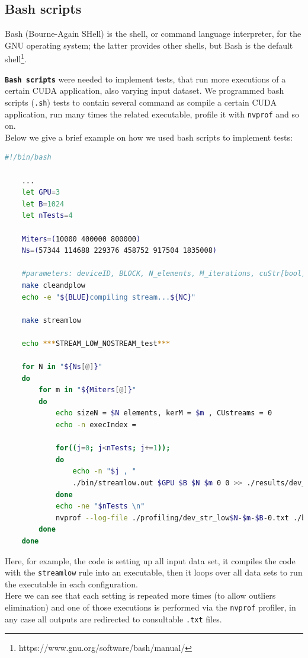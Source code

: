 	\subsection{Bash scripts}
	\label{subs:bash}
	Bash (Bourne-Again SHell) is the shell, or command language interpreter, for the GNU operating system; the latter provides other shells, but Bash is the default  shell\footnote{https://www.gnu.org/software/bash/manual/}. 
	
	\textbf{\texttt{Bash scripts}} were needed to implement tests, that run more executions of a certain CUDA application, also varying input dataset.
	We programmed bash scripts (\texttt{.sh}) tests to contain several command as compile a certain CUDA application, run many times the related executable, profile it with \texttt{nvprof} and so on.\\
	Below we give a brief example on how we used bash scripts to implement tests:
	\begin{lstlisting}[caption={Tests on bash scripts example},language=bash]
	#!/bin/bash
	
	...			
	let GPU=3
	let B=1024
	let nTests=4

	Miters=(10000 400000 800000)
	Ns=(57344 114688 229376 458752 917504 1835008)
		
	#parameters: deviceID, BLOCK, N_elements, M_iterations, cuStr[bool], strNum
	make cleandplow
	echo -e "${BLUE}compiling stream...${NC}"
	
	make streamlow
	
	echo ***STREAM_LOW_NOSTREAM_test***

	for N in "${Ns[@]}"
	do			
		for m in "${Miters[@]}"
		do	
			echo sizeN = $N elements, kerM = $m , CUstreams = 0 
			echo -n execIndex = 
			
			for((j=0; j<nTests; j+=1));
			do
				echo -n "$j , "
				./bin/streamlow.out $GPU $B $N $m 0 0 >> ./results/dev_cos_dp_stl.txt
			done
			echo -ne "$nTests \n"			
			nvprof --log-file ./profiling/dev_str_low$N-$m-$B-0.txt ./bin/streamlow.out $GPU $B $N $m 0 0 >> ./results/dev_cos_dp_stl.txt
		done
	done
	\end{lstlisting}
	Here, for example, the code is setting up all input data set, it compiles the code with the \texttt{streamlow} rule into an executable, then it loops over all data sets to run the executable in each configuration.\\
	Here we can see that each setting is repeated more times (to allow outliers elimination) and one of those executions is performed via the \texttt{nvprof} profiler, in any case all outputs are redirected to consultable \texttt{.txt} files.
	
